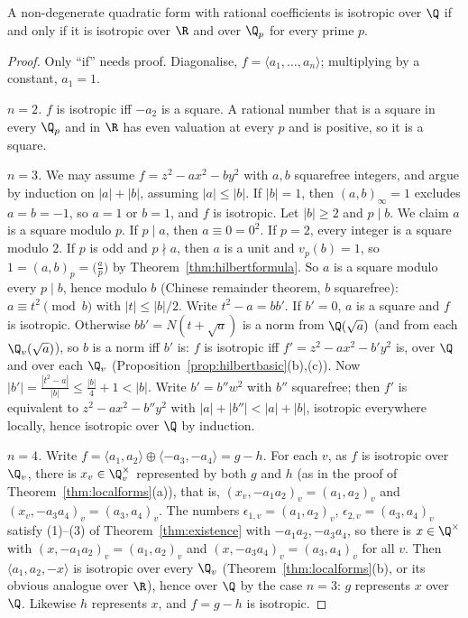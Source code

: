 \begin{theorem}\label{thm:hm}
A non-degenerate quadratic form with rational coefficients is isotropic over $\Q$ if and only if it is isotropic over $\R$
and over $\Q_p$ for every prime $p$.
\end{theorem}
\begin{proof}
Only ``if'' needs proof. Diagonalise, $f=\langle a_1,\dots,a_n\rangle$; multiplying by a constant, $a_1=1$.

\emph{$n=2$.} $f$ is isotropic iff $-a_2$ is a square. A rational number that is a square in every $\Q_p$ and in $\R$ has even
valuation at every $p$ and is positive, so it is a square.

\emph{$n=3$.} We may assume $f=z^2-ax^2-by^2$ with $a,b$ squarefree integers, and argue by induction on $|a|+|b|$, assuming
$|a|\le|b|$. If $|b|=1$, then $(a,b)_\infty=1$ excludes $a=b=-1$, so $a=1$ or $b=1$, and $f$ is isotropic. Let $|b|\ge2$ and $p\mid
b$. We claim $a$ is a square modulo $p$. If $p\mid a$, then $a\equiv0=0^2$. If $p=2$, every integer is a square modulo $2$.
If $p$ is odd and $p\nmid a$, then $a$ is a unit and $v_p(b)=1$, so $1=(a,b)_p=\bigl(\frac ap\bigr)$ by
Theorem~\ref{thm:hilbertformula}. So $a$ is a square modulo every $p\mid b$, hence modulo $b$ (Chinese remainder theorem,
$b$ squarefree): $a\equiv t^2\pmod b$ with $|t|\le|b|/2$. Write $t^2-a=bb'$. If $b'=0$, $a$ is a square and $f$ is isotropic.
Otherwise $bb'=N(t+\sqrt a)$ is a norm from $\Q(\sqrt a)$ (and from each $\Q_v(\sqrt a)$), so $b$ is a norm iff $b'$ is: $f$ is
isotropic iff $f'=z^2-ax^2-b'y^2$ is, over $\Q$ and over each $\Q_v$ (Proposition~\ref{prop:hilbertbasic}(b),(c)). Now
$|b'|=\frac{|t^2-a|}{|b|}\le\frac{|b|}4+1<|b|$. Write $b'=b''w^2$ with $b''$ squarefree; then $f'$ is equivalent to
$z^2-ax^2-b''y^2$ with $|a|+|b''|<|a|+|b|$, isotropic everywhere locally, hence isotropic over $\Q$ by induction.

\emph{$n=4$.} Write $f=\langle a_1,a_2\rangle\oplus\langle-a_3,-a_4\rangle=g-h$. For each $v$, as $f$ is isotropic over $\Q_v$, there
is $x_v\in\Q_v^\times$ represented by both $g$ and $h$ (as in the proof of Theorem~\ref{thm:localforms}(a)), that is,
$(x_v,-a_1a_2)_v=(a_1,a_2)_v$ and $(x_v,-a_3a_4)_v=(a_3,a_4)_v$. The numbers $\epsilon_{1,v}=(a_1,a_2)_v$, $\epsilon_{2,v}=(a_3,a_4)_v$
satisfy (1)--(3) of Theorem~\ref{thm:existence} with $-a_1a_2,-a_3a_4$, so there is $x\in\Q^\times$ with $(x,-a_1a_2)_v=(a_1,a_2)_v$
and $(x,-a_3a_4)_v=(a_3,a_4)_v$ for all $v$. Then $\langle a_1,a_2,-x\rangle$ is isotropic over every $\Q_v$ (Theorem~\ref{thm:localforms}(b),
or its obvious analogue over $\R$), hence over $\Q$ by the case $n=3$: $g$ represents $x$ over $\Q$. Likewise $h$ represents $x$,
and $f=g-h$ is isotropic.


\end{proof}
